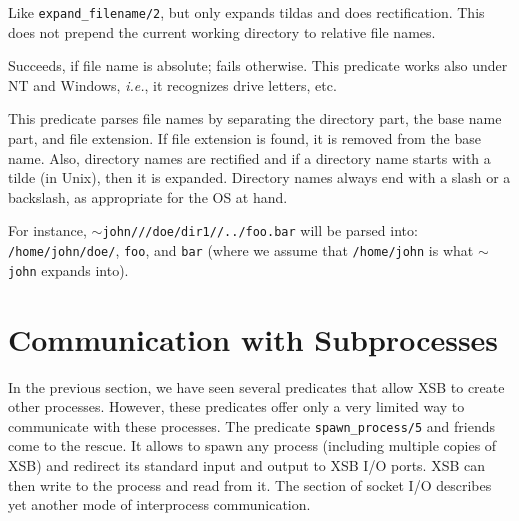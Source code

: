 \begin{description}
Like {\tt expand\_filename/2}, but only expands tildas and does
rectification. This does not prepend the current working directory to
relative file names.

  Succeeds, if file name is absolute; fails
otherwise.  This predicate works also under NT and Windows, {\it
i.e.}, it recognizes drive letters, etc.

This predicate parses file names by separating the directory part, the base
name part, and file extension. If file extension is found, it is removed
from the base name. Also, directory names are rectified and if a directory
name starts with a tilde (in Unix), then it is expanded. Directory names
always end with a slash or a backslash, as appropriate for the OS at hand.

For instance, {\tt $\sim$john///doe/dir1//../foo.bar} will be parsed into:
{\tt /home/john/doe/}, {\tt foo}, and {\tt bar} (where we assume that    
{\tt /home/john} is what {\tt $\sim$john} expands into).  



\end{description}


\section{Communication with Subprocesses}

In the previous section, we have seen several predicates that allow XSB to
create other processes. However, these predicates offer only a very limited
way to communicate with these processes. The predicate
\verb|spawn_process/5| and friends come to the rescue. It allows to spawn
any process (including multiple copies of XSB) and redirect its standard
input and output to XSB I/O ports. XSB can then write to the process and
read from it. The section of socket I/O describes yet another mode of
interprocess communication. 

